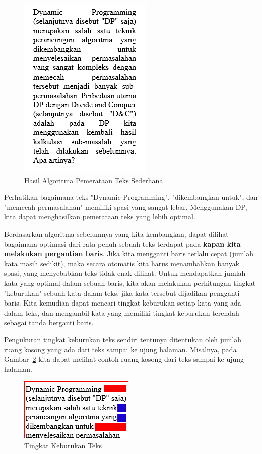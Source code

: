 \begin{figure}
    \includegraphics{fig/TextAlignJustify-Greedy-Bad}
	\caption{Hasil Algoritma Pemerataan Teks Sederhana}
	\label{fig:text-align-raw}
\end{figure}

Perhatikan bagaimana teks "Dynamic Programming", "dikembangkan untuk", dan "memecah permasalahan" memiliki spasi yang sangat lebar. Menggunakan DP, kita dapat menghasilkan pemerataan teks yang lebih optimal.

Berdasarkan algoritma sebelumnya yang kita kembangkan, dapat dilihat bagaimana optimasi dari rata penuh sebuah teks terdapat pada \textbf{kapan kita melakukan pergantian baris}. Jika kita mengganti baris terlalu cepat (jumlah kata masih sedikit), maka secara otomatis kita harus menambahkan banyak spasi, yang menyebabkan teks tidak enak dilihat. Untuk mendapatkan jumlah kata yang optimal dalam sebuah baris, kita akan melakukan perhitungan tingkat "keburukan" sebuah kata dalam teks, jika kata tersebut dijadikan pengganti baris. Kita kemudian dapat mencari tingkat keburukan setiap kata yang ada dalam teks, dan mengambil kata yang memiliki tingkat keburukan terendah sebagai tanda berganti baris.

Pengukuran tingkat keburukan teks sendiri tentunya ditentukan oleh jumlah ruang kosong yang ada dari teks sampai ke ujung halaman. Misalnya, pada Gambar~\ref{fig:text-align-badness} kita dapat melihat contoh ruang kosong dari teks sampai ke ujung halaman.

\begin{figure}
    \includegraphics{fig/TextAlign-Badness}
	\caption{Tingkat Keburukan Teks}
	\label{fig:text-align-badness}
\end{figure}

